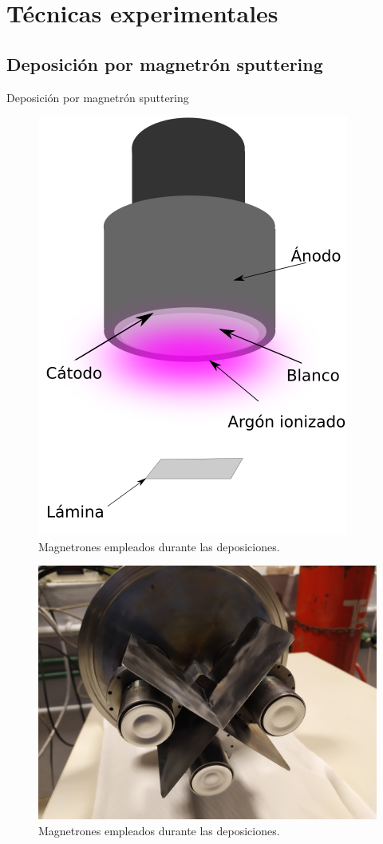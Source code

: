 \documentclass[11pt]{beamer}
\begin{document}
\section{Técnicas experimentales}

	\subsection{Deposición por magnetrón sputtering}
		\begin{frame}{Deposición por magnetrón sputtering}
			\begin{figure}[H]
				\centering
				\includegraphics[scale=0.1]{img/SchemaDeposition.png}
				\caption{Magnetrones empleados durante las deposiciones.}
				\label{magnetrones}
			\end{figure}
			\begin{figure}[H]
				\centering
				\includegraphics[scale=0.01]{img/magnetrones.jpg}
				\caption{Magnetrones empleados durante las deposiciones.}
				\label{magnetrones}
			\end{figure}
		\end{frame}
	
\end{document}
